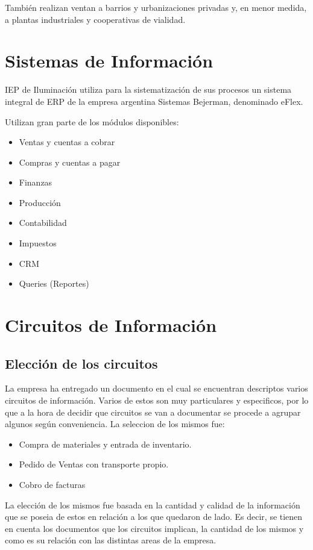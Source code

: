 Tambi\'en realizan ventan a barrios y urbanizaciones privadas y, en menor medida, a plantas industriales y cooperativas de vialidad.

\section{Sistemas de Informaci\'on}

IEP de Iluminaci\'on utiliza para la sistematizaci\'on de sus procesos un sistema integral de ERP de la empresa argentina Sistemas Bejerman, denominado eFlex.

Utilizan gran parte de los m\'odulos disponibles:

\begin{itemize}
\item Ventas y cuentas a cobrar
\item Compras y cuentas a pagar
\item Finanzas
\item Producci\'on
\item Contabilidad
\item Impuestos
\item CRM
\item Queries (Reportes)
\end{itemize}

\section{ Circuitos de Informaci\'on}
\subsection{ Elecci\'on de los circuitos}

La empresa ha entregado un documento en el cual se encuentran descriptos varios circuitos de informaci\'on. Varios de estos son muy particulares y especificos, por lo que a la hora de decidir que circuitos se van a documentar se procede a agrupar algunos seg\'un conveniencia.
La seleccion de los mismos fue:
\begin{itemize}
\item Compra de materiales y entrada de inventario.
\item Pedido de Ventas con transporte propio.
\item Cobro de facturas
\end{itemize}

La elecci\'on de los mismos fue basada en la cantidad y calidad de la informaci\'on que se poseia de estos en relaci\'on a los que quedaron de lado. Es decir, se tienen en cuenta los documentos que los circuitos implican, la cantidad de los mismos y como es su relaci\'on con las distintas areas de la empresa.
